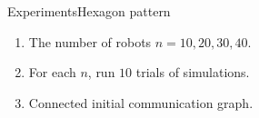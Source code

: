 \begin{frame}{Experiments}{Hexagon pattern}
  \small{
    \begin{enumerate}
    \item The number of robots $n=10,20,30,40$.
    \item For each $n$, run $10$ trials of simulations.
    \item Connected initial communication graph.
    \end{enumerate}
  }
\end{frame}